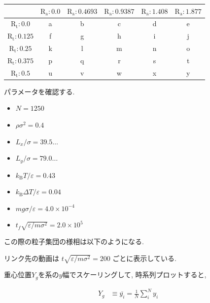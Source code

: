 \begin{tabular}{|c|c|c|c|c|c|} \hline
        & $\text{R}_\text{a}:0.0$ & $\text{R}_\text{a}:0.4693$ & $\text{R}_\text{a}:0.9387$ & $\text{R}_\text{a}:1.408$ & $\text{R}_\text{a}:1.877$ \\ \hline
  $\text{R}_\text{t}:0.0$ & a      & b      & c      & d      & e     \\ \hline
  $\text{R}_\text{t}:0.125$ & f      & g      & h      & i      & j     \\ \hline
  $\text{R}_\text{t}:0.25$ & k      & l      & m      & n      & o     \\ \hline
  $\text{R}_\text{t}:0.375$ & p      & q      & r      & s      & t     \\ \hline
  $\text{R}_\text{t}:0.5$ & u      & v      & w      & x      & y     \\ \hline
\end{tabular}

\vspace{1\baselineskip}



パラメータを確認する.

\begin{itemize}
  \item $N = 1250$
  \item $\rho {\sigma}^2 = 0.4$
  \item $L_x / \sigma = 39.5\dots$
  \item $L_y / \sigma = 79.0\dots$
  \item $k_{\text{B}} T / \varepsilon = 0.43$
  \item $k_{\text{B}} \Delta T / \varepsilon = 0.04$
  \item $mg\sigma/\varepsilon = 4.0 \times 10^{-4}$
  \item $t_f \sqrt{\varepsilon / m \sigma^2} = 2.0 \times 10^{5}$
\end{itemize}

この際の粒子集団の様相は以下のようになる.

リンク先の動画は $t \sqrt{\varepsilon / m \sigma^2} = 200$ ごとに表示している. 



重心位置$Y_g$を系の$y$幅でスケーリングして, 時系列プロットすると,

\begin{align}
  Y_g &\equiv \bar{y_i} = \frac{1}{N} \sum_{i}^{N} y_i
\end{align}




